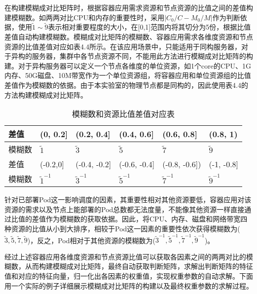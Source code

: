 在构建模糊成对比矩阵时，根据容器应用需求资源和节点资源的比值之间的差值构建模糊数。如两两对比CPU和内存的重要性时，采用$|C_{0}/C-M_{0}/M|$作为判断依据，使用$\widetilde{1}\sim\widetilde{9}$表示相对重要程度的大小，在[0,1]范围内将其切分为5份，根据比值差值自动构建模糊数。模糊成对比矩阵的模糊数、容器应用需求各维度资源和节点资源的比值差值对应如表4.4所示。在该应用场景中，只能适用于同构服务器，对于异构的服务器，集群中各节点资源不同，不能用此方法进行模糊成对比矩阵的构建。对于异构服务器可以定义一个节点各维度的单位资源，如1个core的CPU、1G内存、50G磁盘、10M带宽作为一个单位资源组，将容器应用和单位资源组的比值差值作为模糊数的依据。由于本实验室的物理节点都是同构的，因此使用表4.4的方法构建模糊成对比矩阵。
\begin{table}[htbp]
	\centering\dawu[1.3]
	\caption{模糊数和资源比值差值对应表}
	\begin{tabular}{|p{1.8cm}<{\centering}|p{1.8cm}<{\centering}|p{1.8cm}<{\centering}|p{1.8cm}<{\centering}|p{1.8cm}<{\centering}|p{1.8cm}<{\centering}|} \hline
		差值 & (0, 0.2] & (0.2, 0.4] & (0.4, 0.6] & (0.6, 0.8] & (0.8, 1) \\ \hline
		模糊数 & $\widetilde{1}$ & $\widetilde{3}$ & $\widetilde{5}$ & $\widetilde{7}$  & $\widetilde{9}$  \\ \hline
		差值 & (-0.2,0] & (-0.4, -0.2] & (-0.6, -0.4] & (-0.8, -0.6]) & (-1, -0.8]  \\ \hline
		模糊数 & $\widetilde{1}^{-1}$ & $\widetilde{3}^{-1}$ & $\widetilde{5}^{-1}$ & $\widetilde{7}^{-1}$ & $\widetilde{9}^{-1}$  \\ \hline
	\end{tabular}
\end{table}

针对已部署Pod这一影响调度的因素，其重要性相对其他资源要低，容器应用对该资源的需求以及节点上能部署的Pod总数都无法度量，不能像其他资源一样直接通过比值的差值作为模糊数的获取依据。因此，将CPU、内存、磁盘和网络带宽四种资源的比值从小到大排序，相较于Pod这一因素的重要性依次获得模糊数为(${\widetilde{3},\widetilde{5},\widetilde{7},\widetilde{9}}$)，反之，Pod相对于其他资源的模糊数为(${\widetilde{3}^{-1},\widetilde{5}^{-1},\widetilde{7}^{-1},\widetilde{9}^{-1}}$)。

经过上述容器应用各维度资源和节点资源比值可以获取各因素之间的两两对比的模糊数，从而构建模糊成对比矩阵，最终自动获取判断矩阵，求解出判断矩阵的特征值和对应的特征向量，归一化出各因素的权重值，实现权重参数的自动求解。下面用一个实际的例子详细展示模糊成对比矩阵的构建以及最终权重参数的求解过程。



















